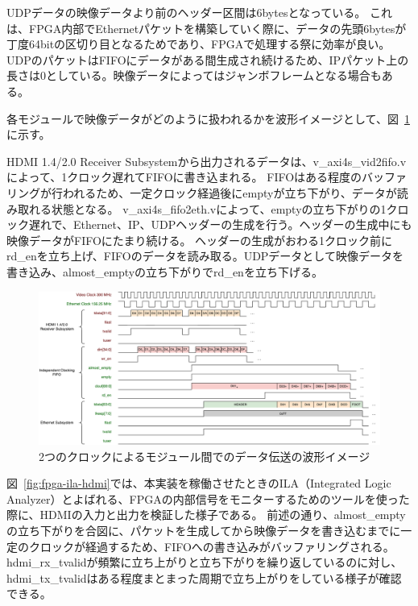 UDPデータの映像データより前のヘッダー区間は6bytesとなっている。
これは、FPGA内部でEthernetパケットを構築していく際に、データの先頭6bytesが丁度64bitの区切り目となるためであり、FPGAで処理する祭に効率が良い。
UDPのパケットはFIFOにデータがある間生成され続けるため、IPパケット上の長さは0としている。映像データによってはジャンボフレームとなる場合もある。

各モジュールで映像データがどのように扱われるかを波形イメージとして、図~\ref{fig:fpga-first-pixel-waveform}に示す。

HDMI 1.4/2.0 Receiver Subsystemから出力されるデータは、v\_axi4s\_vid2fifo.vによって、1クロック遅れてFIFOに書き込まれる。
FIFOはある程度のバッファリングが行われるため、一定クロック経過後にemptyが立ち下がり、データが読み取れる状態となる。
v\_axi4s\_fifo2eth.vによって、emptyの立ち下がりの1クロック遅れで、Ethernet、IP、UDPヘッダーの生成を行う。ヘッダーの生成中にも映像データがFIFOにたまり続ける。
ヘッダーの生成がおわる1クロック前にrd\_enを立ち上げ、FIFOのデータを読み取る。UDPデータとして映像データを書き込み、almost\_emptyの立ち下がりでrd\_enを立ち下げる。

\begin{figure}[htbp]
  \begin{center}
    \includegraphics[bb=0 0 1118 502,width=22.5cm,angle=270]{img/fpga-first-pixel-waveform.pdf}
  \end{center}
  \caption{2つのクロックによるモジュール間でのデータ伝送の波形イメージ}
  \label{fig:fpga-first-pixel-waveform}
\end{figure}

図~\ref{fig:fpga-ila-hdmi}では、本実装を稼働させたときのILA（Integrated Logic Analyzer）とよばれる、FPGAの内部信号をモニターするためのツールを使った際に、HDMIの入力と出力を検証した様子である。
前述の通り、almost\_emptyの立ち下がりを合図に、パケットを生成してから映像データを書き込むまでに一定のクロックが経過するため、FIFOへの書き込みがバッファリングされる。
hdmi\_rx\_tvalidが頻繁に立ち上がりと立ち下がりを繰り返しているのに対し、hdmi\_tx\_tvalidはある程度まとまった周期で立ち上がりをしている様子が確認できる。

